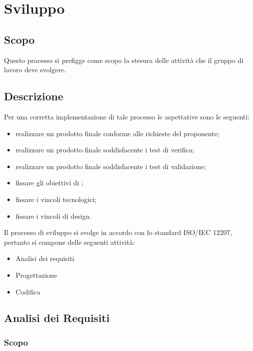 \documentclass[../NomeDocumento.tex]{subfiles}
\begin{document}
	

\section{Sviluppo}

\subsection{Scopo}

Questo processo si prefigge come scopo la stesura delle attività che il gruppo di lavoro deve svolgere.

\subsection{Descrizione}

Per una corretta implementazione di tale processo le aspettative sono le seguenti:

\begin{itemize}
	\item realizzare un prodotto finale conforme alle richieste del proponente;
	\item realizzare un prodotto finale soddisfacente i test di verifica;
	\item realizzare un prodotto finale soddisfacente i test di validazione;
	\item fissare gli obiettivi di ;
	\item fissare i vincoli tecnologici;
	\item fissare i vincoli di design.
\end{itemize}

Il processo di sviluppo si svolge in accordo con lo standard ISO/IEC 12207, pertanto si compone delle seguenti attività:

\begin{itemize}
	\item Analisi dei requisiti
	\item Progettazione
	\item Codifica
\end{itemize}

\subsection{Analisi dei Requisiti}

	\subsubsection{Scopo} 
	
\end{document}
